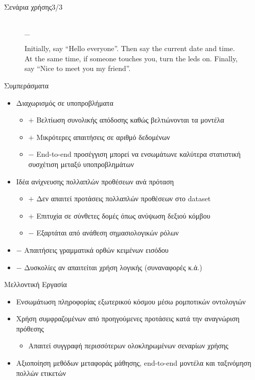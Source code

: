 \documentclass{beamer}
\makeatletter
\newcommand{\escapeunderscore}{\begingroup\@makeother\_\@escapeunderscore}
\newcommand*{\@escapeunderscore}[1]{#1\endgroup}
\makeatother
\begin{document}
{\begin{frame}{Σενάρια χρήσης\hfill{}3/3}
\begin{figure}
\begin{columns}[onlytextwidth]
            \caption{Initially, say ``Hello everyone''.
                Then say the current date and time.
                At the same time, if someone touches you, turn the leds on.
                Finally, say ``Nice to meet you my friend''.}
            \begin{adjustbox}{max width=\textwidth, max height=0.9\textheight}
                \escapeunderscore{}
            \end{adjustbox}
        \end{columns}
    \end{figure}
\end{frame}
}

\newcommand\pro{\item[$+$]}
\newcommand\con{\item[$-$]}
\begin{frame}{Συμπεράσματα}
    \begin{itemize}
        \item Διαχωρισμός σε υποπροβλήματα
              \begin{itemize}
                  \pro Βελτίωση συνολικής απόδοσης καθώς βελτιώνονται τα μοντέλα
                  \pro Μικρότερες απαιτήσεις σε αριθμό δεδομένων
                  \con End-to-end προσέγγιση μπορεί να ενσωμάτωνε καλύτερα στατιστική συσχέτιση μεταξύ υποπροβλημάτων
              \end{itemize}
        \item Ιδέα ανίχνευσης πολλαπλών προθέσεων ανά πρόταση
              \begin{itemize}
                  \pro Δεν απαιτεί προτάσεις πολλαπλών προθέσεων στο dataset
                  \pro Επιτυχία σε σύνθετες δομές όπως ανύψωση δεξιού κόμβου
                  \con Εξαρτάται από ανάθεση σημασιολογικών ρόλων
              \end{itemize}
              \con Απαιτήσεις γραμματικά ορθών κειμένων εισόδου
              \con Δυσκολίες αν απαιτείται χρήση λογικής (συναναφορές κ.ά.)
    \end{itemize}
\end{frame}

\begin{frame}{Μελλοντική Εργασία}
    \begin{itemize}
        \item Ενσωμάτωση πληροφορίας εξωτερικού κόσμου μέσω ρομποτικών οντολογιών
        \item Χρήση συμφραζομένων από προηγούμενες προτάσεις κατά την αναγνώριση πρόθεσης
              \begin{itemize}
                  \item Απαιτεί συγγραφή περισσότερων ολοκληρωμένων σεναρίων χρήσης
              \end{itemize}
        \item Αξιοποίηση μεθόδων μεταφοράς μάθησης, end-to-end μοντέλα και ταξινόμηση πολλών ετικετών
    \end{itemize}
\end{frame}
\end{document}
